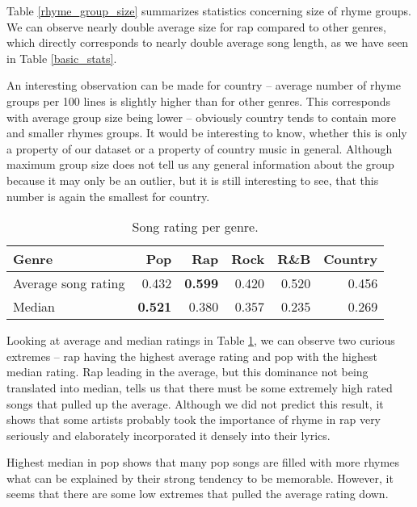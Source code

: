Table \ref{rhyme_group_size} summarizes statistics concerning size of rhyme groups. We can observe nearly double average size for rap compared to other genres, which directly corresponds to nearly double average song length, as we have seen in Table \ref{basic_stats}. 

An interesting observation can be made for country -- average number of rhyme groups per 100 lines is slightly higher than for other genres. This corresponds with average group size being lower -- obviously country tends to contain more and smaller rhymes groups. It would be interesting to know, whether this is only a property of our dataset or a property of country music in general. Although maximum group size does not tell us any general information about the group because it may only be an outlier, but it is still interesting to see, that this number is again the smallest for country.

\begin{table}[h!]
	\centering
	\begin{tabular}{l | r r r r r} 	
		Genre & 			Pop & 		Rap & 		Rock & 		R\&B & 		Country\\ 
		\midrule
		Average song rating& 0.432 & \textbf{0.599} &0.420 &0.520 &0.456  \\
		Median & \textbf{0.521} & 0.380 &0.357 &0.235 & 0.269\\
	\end{tabular}
	\caption{Song rating per genre.} 
	\label{song_rating_stats}
\end{table}

Looking at average and median ratings in Table \ref{song_rating_stats}, we can observe two curious extremes -- rap having the highest average rating and pop with the highest median rating. Rap leading in the average, but this dominance not being translated into median, tells us that there must be some extremely high rated songs that pulled up the average. Although we did not predict this result, it shows that some artists probably took the importance of rhyme in rap very seriously and elaborately incorporated it densely into their lyrics.

Highest median in pop shows that many pop songs are filled with more rhymes what can be explained by their strong tendency to be memorable. However, it seems that there are some low extremes that pulled the average rating down.
